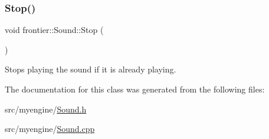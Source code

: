 \subsubsection{\texorpdfstring{Stop()}{Stop()}}
{\footnotesize\ttfamily void frontier\+::\+Sound\+::\+Stop (\begin{DoxyParamCaption}{ }\end{DoxyParamCaption})}



Stops playing the sound if it is already playing. 



The documentation for this class was generated from the following files\+:\begin{DoxyCompactItemize}
\item 
src/myengine/\hyperlink{_sound_8h}{Sound.\+h}\item 
src/myengine/\hyperlink{_sound_8cpp}{Sound.\+cpp}\end{DoxyCompactItemize}
